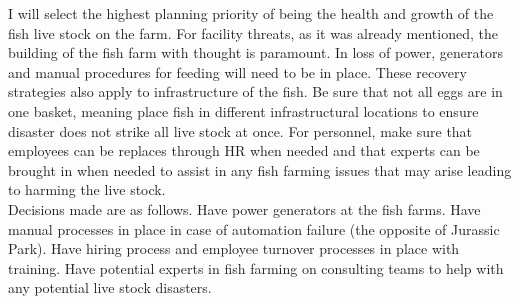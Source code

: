 \documentclass[paper=a4, fontsize=11pt]{scrartcl} %
\numberwithin{equation}{section} %
\numberwithin{figure}{section} %
\numberwithin{table}{section} %
\begin{document}
I will select the highest planning priority of being the health and growth of the
fish live stock on the farm. For facility threats, as it was already mentioned,
the building of the fish farm with thought is paramount. In loss of power, generators
and manual procedures for feeding will need to be in place. These recovery strategies
also apply to infrastructure of the fish. Be sure that not all eggs are in one basket,
meaning place fish in different infrastructural locations to ensure disaster does not
strike all live stock at once. For personnel, make sure that employees can be replaces
through HR when needed and that experts can be brought in when needed to assist in 
any fish farming issues that may arise leading to harming the live stock.\\

Decisions made are as follows. Have power generators at the fish farms. Have
manual processes in place in case of automation failure (the opposite of Jurassic Park).
Have hiring process and employee turnover processes in place with training. Have
potential experts in fish farming on consulting teams to help with any potential
live stock disasters.

\end{document}
